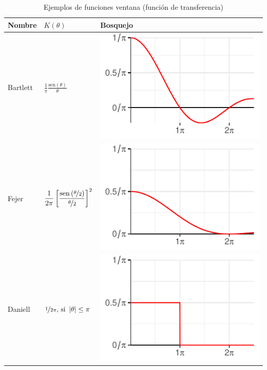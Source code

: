 \documentclass[12pt,letterpaper]{book}
\newcommand{\SEN}[1]{\mathrm{sen}\left( #1 \right)}
\newcommand{\abso}[1]{\left| #1 \right|}
\begin{document}
\begin{table}
\label{ventanas2}
\caption{Ejemplos de funciones ventana (función de transferencia)}
\centering
\begin{small}
\begin{tabular}{lll}
\toprule
Nombre & $K(\theta)$ & Bosquejo \\
\midrule
Bartlett &
$\displaystyle 
\frac{1}{\pi} \frac{\SEN{\theta}}{\theta}
$
& \includegraphics[scale=.4]{./img_ventanas/ventana_2_bartlett.pdf} \\
\rowcolor{gris}
Fejer &
$\displaystyle 
\frac{1}{2\pi} \left[ \frac{\SEN{\nicefrac{\theta}{2}}}{\nicefrac{\theta}{2}} \right]^{2}
$
& \includegraphics[scale=.4]{./img_ventanas/ventana_2_fejer.pdf} \\
Daniell &
$
\displaystyle 
\nicefrac{1}{2\pi} \text{, si } \abso{\theta}\leq \pi
$
& \includegraphics[scale=.4]{./img_ventanas/ventana_2_daniell.pdf} \\

\end{tabular}
\end{small}
\end{table}
\end{document}
